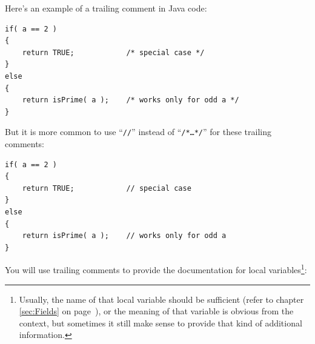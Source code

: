\documentclass[11pt,a4paper, titlepage, parskip=half, headsepline, footsepline, cleardoublepage=current, headheight=1cm]{scrbook}
\newcommand*{\tqvref}[1]{\hyperref[{#1}]{\ref*{#1}} on page~\pageref{#1}}
\begin{document}
Here's an example of a trailing comment in Java code:
\begin{lstlisting}
if( a == 2 )
{
    return TRUE;            /* special case */
}
else
{
    return isPrime( a );    /* works only for odd a */
}
\end{lstlisting}

But it is more common to use “\verb#//#” instead of “\verb#/*…*/#” for these trailing comments:
\begin{lstlisting}
if( a == 2 )
{
    return TRUE;            // special case
}
else
{
    return isPrime( a );    // works only for odd a
}
\end{lstlisting}

You will use trailing comments to provide the documentation for local variables\footnote{Usually, the name of that local variable should be sufficient (refer to chapter \tqvref{sec:Fields}), or the meaning of that variable is obvious from the context, but sometimes it still make sense to provide that kind of additional information.}:
\end{document}
